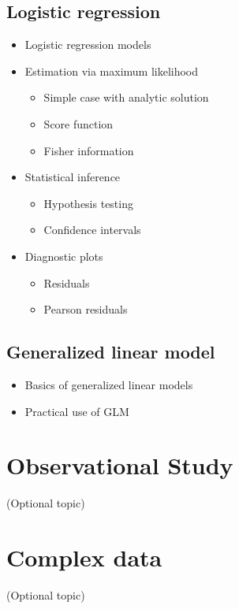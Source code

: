 \documentclass[12pt,]{book}
\providecommand{\tightlist}{%
  \setlength{\itemsep}{0pt}\setlength{\parskip}{0pt}}
\begin{document}
\section{Logistic regression}\label{logistic-regression}

\begin{itemize}
\tightlist
\item
  Logistic regression models
\item
  Estimation via maximum likelihood

  \begin{itemize}
  \tightlist
  \item
    Simple case with analytic solution
  \item
    Score function
  \item
    Fisher information
  \end{itemize}
\item
  Statistical inference

  \begin{itemize}
  \tightlist
  \item
    Hypothesis testing
  \item
    Confidence intervals
  \end{itemize}
\item
  Diagnostic plots

  \begin{itemize}
  \tightlist
  \item
    Residuals
  \item
    Pearson residuals
  \end{itemize}
\end{itemize}

\section{Generalized linear model}\label{generalized-linear-model}

\begin{itemize}
\tightlist
\item
  Basics of generalized linear models
\item
  Practical use of GLM
\end{itemize}

\chapter{Observational Study}\label{ch:obs}

(Optional topic)

\chapter{Complex data}\label{ch:dim}

(Optional topic)


\end{document}
